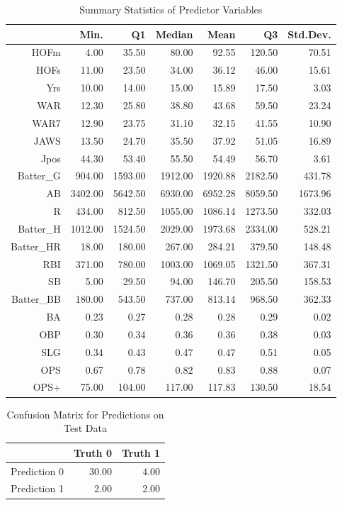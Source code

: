 \documentclass[12pt,english]{article}
\begin{document}
\begin{table}[ht]
\caption{Summary Statistics of Predictor Variables}
\vspace{10pt}
\centering
\begin{tabular}{rrrrrrr}
  \hline
 & Min. & Q1 & Median & Mean & Q3 & Std.Dev. \\ 
  \hline
HOFm & 4.00 & 35.50 & 80.00 & 92.55 & 120.50 & 70.51 \\ 
  HOFs & 11.00 & 23.50 & 34.00 & 36.12 & 46.00 & 15.61 \\ 
  Yrs & 10.00 & 14.00 & 15.00 & 15.89 & 17.50 & 3.03 \\ 
  WAR & 12.30 & 25.80 & 38.80 & 43.68 & 59.50 & 23.24 \\ 
  WAR7 & 12.90 & 23.75 & 31.10 & 32.15 & 41.55 & 10.90 \\ 
  JAWS & 13.50 & 24.70 & 35.50 & 37.92 & 51.05 & 16.89 \\ 
  Jpos & 44.30 & 53.40 & 55.50 & 54.49 & 56.70 & 3.61 \\ 
  Batter\_G & 904.00 & 1593.00 & 1912.00 & 1920.88 & 2182.50 & 431.78 \\ 
  AB & 3402.00 & 5642.50 & 6930.00 & 6952.28 & 8059.50 & 1673.96 \\ 
  R & 434.00 & 812.50 & 1055.00 & 1086.14 & 1273.50 & 332.03 \\ 
  Batter\_H & 1012.00 & 1524.50 & 2029.00 & 1973.68 & 2334.00 & 528.21 \\ 
  Batter\_HR & 18.00 & 180.00 & 267.00 & 284.21 & 379.50 & 148.48 \\ 
  RBI & 371.00 & 780.00 & 1003.00 & 1069.05 & 1321.50 & 367.31 \\ 
  SB & 5.00 & 29.50 & 94.00 & 146.70 & 205.50 & 158.53 \\ 
  Batter\_BB & 180.00 & 543.50 & 737.00 & 813.14 & 968.50 & 362.33 \\ 
  BA & 0.23 & 0.27 & 0.28 & 0.28 & 0.29 & 0.02 \\ 
  OBP & 0.30 & 0.34 & 0.36 & 0.36 & 0.38 & 0.03 \\ 
  SLG & 0.34 & 0.43 & 0.47 & 0.47 & 0.51 & 0.05 \\ 
  OPS & 0.67 & 0.78 & 0.82 & 0.83 & 0.88 & 0.07 \\ 
  OPS+ & 75.00 & 104.00 & 117.00 & 117.83 & 130.50 & 18.54 \\ 
   \hline
\end{tabular}
\end{table}
\begin{table}[ht]
\caption{Confusion Matrix for Predictions on Test Data}
\vspace{10pt}
\centering
\begin{tabular}{rrr}
  \hline
 & Truth 0 & Truth 1 \\ 
  \hline
Prediction 0 & 30.00 & 4.00 \\ 
  Prediction 1 & 2.00 & 2.00 \\ 
   \hline
\end{tabular}
\end{table}
\end{document}
